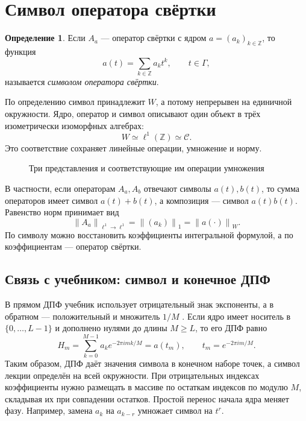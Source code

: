 \documentclass[12pt,a4paper]{article}
\theoremstyle{definition}
\newtheorem{definition}{Определение}
\theoremstyle{remark}
\newcommand{\ZZ}{\mathbb{Z}}
\newcommand{\norm}[1]{\left\lVert #1\right\rVert}
\newcommand{\Conv}{\mathcal C}
\begin{document}
\section{Символ оператора свёртки}

\begin{definition}
Если $A_a$ --- оператор свёртки с ядром $a=(a_k)_{k\in\ZZ}$, то функция
\[
  a(t)=\sum_{k\in\ZZ}a_kt^k,\qquad t\in\Gamma,
\]
называется \emph{символом оператора свёртки}.
\end{definition}

По определению символ принадлежит $W$, а потому непрерывен на
единичной окружности. Ядро, оператор и символ описывают один объект
в трёх изометрически изоморфных алгебрах:
\[
  \boxed{W\simeq\ell^1(\ZZ)\simeq\Conv}.
\]
Это соответствие сохраняет линейные операции, умножение и норму.

\begin{figure}[ht]
  \centering
  \caption{Три представления и соответствующие им операции умножения}
\end{figure}

В частности, если операторам $A_a,A_b$ отвечают символы $a(t),b(t)$,
то сумма операторов имеет символ $a(t)+b(t)$, а композиция --- символ
$a(t)b(t)$. Равенство норм принимает вид
\[
  \norm{A_a}_{\ell^1\to\ell^1}
  =\norm{(a_k)}_1=\norm{a(\cdot)}_W.
\]
По символу можно восстановить коэффициенты интегральной формулой,
а по коэффициентам --- оператор свёртки.

\subsection{Связь с учебником: символ и конечное ДПФ}

В прямом ДПФ учебник использует отрицательный знак экспоненты,
а в обратном --- положительный и множитель $1/M$
\cite[\S\,4.4.1, с.~269]{GW2012}.
Если ядро имеет носитель в $\{0,\ldots,L-1\}$ и дополнено
нулями до длины $M\geqslant L$, то его ДПФ равно
\[
  H_m=\sum_{k=0}^{M-1}a_k e^{-2\pi i mk/M}
     =a(t_m),\qquad t_m=e^{-2\pi i m/M}.
\]
Таким образом, ДПФ даёт значения символа в конечном наборе точек,
а символ лекции определён на всей окружности.
При отрицательных индексах коэффициенты нужно размещать в массиве
по остаткам индексов по модулю $M$, складывая их при совпадении
остатков. Простой перенос начала ядра
меняет фазу. Например, замена $a_k$ на $a_{k-r}$
умножает символ на $t^r$.
\end{document}
